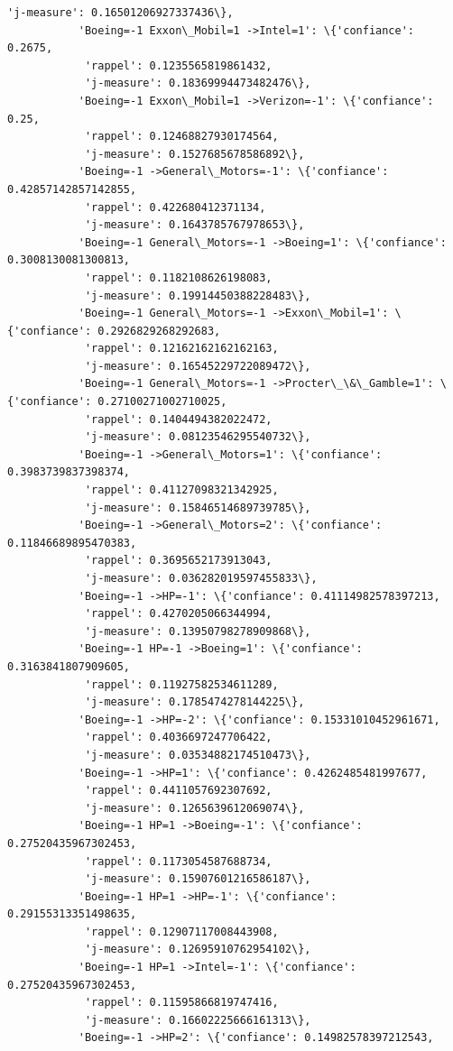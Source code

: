 \documentclass[11pt]{article}
\begin{document}
\begin{Verbatim}[commandchars=\\\{\}]
            'j-measure': 0.16501206927337436\},
           'Boeing=-1 Exxon\_Mobil=1 ->Intel=1': \{'confiance': 0.2675,
            'rappel': 0.1235565819861432,
            'j-measure': 0.18369994473482476\},
           'Boeing=-1 Exxon\_Mobil=1 ->Verizon=-1': \{'confiance': 0.25,
            'rappel': 0.12468827930174564,
            'j-measure': 0.1527685678586892\},
           'Boeing=-1 ->General\_Motors=-1': \{'confiance': 0.42857142857142855,
            'rappel': 0.422680412371134,
            'j-measure': 0.1643785767978653\},
           'Boeing=-1 General\_Motors=-1 ->Boeing=1': \{'confiance': 0.3008130081300813,
            'rappel': 0.1182108626198083,
            'j-measure': 0.19914450388228483\},
           'Boeing=-1 General\_Motors=-1 ->Exxon\_Mobil=1': \{'confiance': 0.2926829268292683,
            'rappel': 0.12162162162162163,
            'j-measure': 0.16545229722089472\},
           'Boeing=-1 General\_Motors=-1 ->Procter\_\&\_Gamble=1': \{'confiance': 0.27100271002710025,
            'rappel': 0.1404494382022472,
            'j-measure': 0.08123546295540732\},
           'Boeing=-1 ->General\_Motors=1': \{'confiance': 0.3983739837398374,
            'rappel': 0.41127098321342925,
            'j-measure': 0.15846514689739785\},
           'Boeing=-1 ->General\_Motors=2': \{'confiance': 0.11846689895470383,
            'rappel': 0.3695652173913043,
            'j-measure': 0.036282019597455833\},
           'Boeing=-1 ->HP=-1': \{'confiance': 0.41114982578397213,
            'rappel': 0.4270205066344994,
            'j-measure': 0.13950798278909868\},
           'Boeing=-1 HP=-1 ->Boeing=1': \{'confiance': 0.3163841807909605,
            'rappel': 0.11927582534611289,
            'j-measure': 0.1785474278144225\},
           'Boeing=-1 ->HP=-2': \{'confiance': 0.15331010452961671,
            'rappel': 0.4036697247706422,
            'j-measure': 0.03534882174510473\},
           'Boeing=-1 ->HP=1': \{'confiance': 0.4262485481997677,
            'rappel': 0.4411057692307692,
            'j-measure': 0.1265639612069074\},
           'Boeing=-1 HP=1 ->Boeing=-1': \{'confiance': 0.27520435967302453,
            'rappel': 0.1173054587688734,
            'j-measure': 0.15907601216586187\},
           'Boeing=-1 HP=1 ->HP=-1': \{'confiance': 0.29155313351498635,
            'rappel': 0.12907117008443908,
            'j-measure': 0.12695910762954102\},
           'Boeing=-1 HP=1 ->Intel=-1': \{'confiance': 0.27520435967302453,
            'rappel': 0.11595866819747416,
            'j-measure': 0.16602225666161313\},
           'Boeing=-1 ->HP=2': \{'confiance': 0.14982578397212543,

\end{Verbatim}
\end{document}
